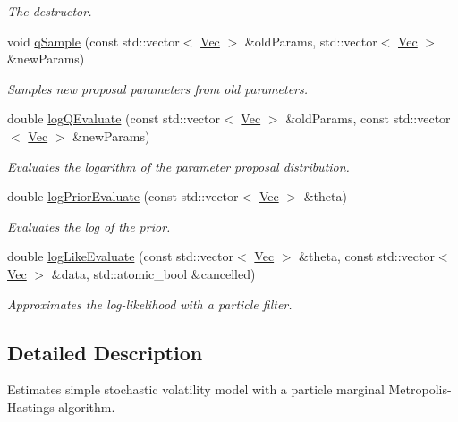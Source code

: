\begin{DoxyCompactItemize}
\begin{DoxyCompactList}\small\item\em The destructor. \end{DoxyCompactList}\item 
void \hyperlink{classPmmh__svol__sisr_a18df26cb5c0bddefbd24866b1b4ff142}{q\+Sample} (const std\+::vector$<$ \hyperlink{pmfs_8h_a4c7df05c6f5e8a0d15ae14bcdbc07152}{Vec} $>$ \&old\+Params, std\+::vector$<$ \hyperlink{pmfs_8h_a4c7df05c6f5e8a0d15ae14bcdbc07152}{Vec} $>$ \&new\+Params)
\begin{DoxyCompactList}\small\item\em Samples new proposal parameters from old parameters. \end{DoxyCompactList}\item 
double \hyperlink{classPmmh__svol__sisr_a8164b385edb083df605ba766e000c12a}{log\+Q\+Evaluate} (const std\+::vector$<$ \hyperlink{pmfs_8h_a4c7df05c6f5e8a0d15ae14bcdbc07152}{Vec} $>$ \&old\+Params, const std\+::vector$<$ \hyperlink{pmfs_8h_a4c7df05c6f5e8a0d15ae14bcdbc07152}{Vec} $>$ \&new\+Params)
\begin{DoxyCompactList}\small\item\em Evaluates the logarithm of the parameter proposal distribution. \end{DoxyCompactList}\item 
double \hyperlink{classPmmh__svol__sisr_ab6c9983faf8ca460f8a8081c6a148aa2}{log\+Prior\+Evaluate} (const std\+::vector$<$ \hyperlink{pmfs_8h_a4c7df05c6f5e8a0d15ae14bcdbc07152}{Vec} $>$ \&theta)
\begin{DoxyCompactList}\small\item\em Evaluates the log of the prior. \end{DoxyCompactList}\item 
double \hyperlink{classPmmh__svol__sisr_af0bb463ef4d74e60022a4955f565390e}{log\+Like\+Evaluate} (const std\+::vector$<$ \hyperlink{pmfs_8h_a4c7df05c6f5e8a0d15ae14bcdbc07152}{Vec} $>$ \&theta, const std\+::vector$<$ \hyperlink{pmfs_8h_a4c7df05c6f5e8a0d15ae14bcdbc07152}{Vec} $>$ \&data, std\+::atomic\+\_\+bool \&cancelled)
\begin{DoxyCompactList}\small\item\em Approximates the log-\/likelihood with a particle filter. \end{DoxyCompactList}\end{DoxyCompactItemize}


\subsection{Detailed Description}
Estimates simple stochastic volatility model with a particle marginal Metropolis-\/\+Hastings algorithm. 


